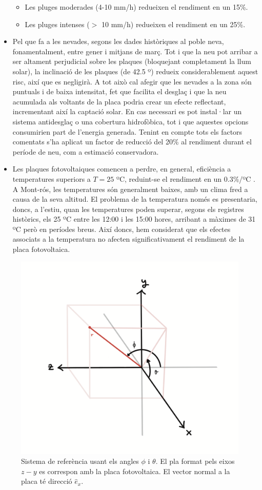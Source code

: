 \documentclass[10pt, twoside, a4paper]{article}
\begin{document}
\begin{itemize}
\begin{itemize}
        \item Les pluges moderades (4-10 mm/h) redueixen el rendiment en un 15\%.
        \item Les pluges intenses ($>$ 10 mm/h) redueixen el rendiment en un 25\%.
    \end{itemize}
    \item Pel que fa a les nevades, segons les dades històriques al poble neva, fonamentalment, entre gener i mitjans de març. Tot i que la neu pot arribar a ser altament perjudicial sobre les plaques (bloquejant completament la llum solar), la inclinació de les plaques (de 42.5 º) redueix considerablement aquest risc, així que es negligirà. A tot això cal afegir que les nevades a la zona són puntuals i de baixa intensitat, fet que facilita el desglaç i que la neu acumulada als voltants de la placa podria crear un efecte reflectant, incrementant així la captació solar.
    En cas necessari es pot instal·lar un sistema antidesglaç o una cobertura hidrofòbica, tot i que aquestes opcions consumirien part de l'energia generada. 
    Tenint en compte tots els factors comentats s'ha aplicat un factor de reducció del 20\% al rendiment durant el període de neu, com a estimació conservadora.
    \item Les plaques fotovoltaiques comencen a perdre, en general, eficiència a temperatures superiors a $T=25$ ºC, reduint-se el rendiment en un 0.3\%/ºC \cite{ref8}. A Mont-rós, les temperatures són generalment baixes, amb un clima fred a causa de la seva altitud. El problema de la temperatura només es presentaria, doncs, a l'estiu, quan les temperatures poden superar, segons els registres històrics, els 25 ºC entre les 12:00 i les 15:00 hores, arribant a màximes de 31 ºC però en períodes breus. 
    Així doncs, hem considerat que els efectes associats a la temperatura no afecten significativament el rendiment de la placa fotovoltaica.

\end{itemize}

\begin{figure}[h!]
    \centering
    \includegraphics[width=0.5\linewidth]{../latex/Coordenades.png}
    \caption{Sistema de referència usant els angles $\phi$ i $\theta$. El pla format pels eixos $z-y$ es correspon amb la placa fotovoltaica. El vector normal a la placa té direcció $\hat{e}_x$.}
    \label{fig:sr}
\end{figure}
\end{document}

